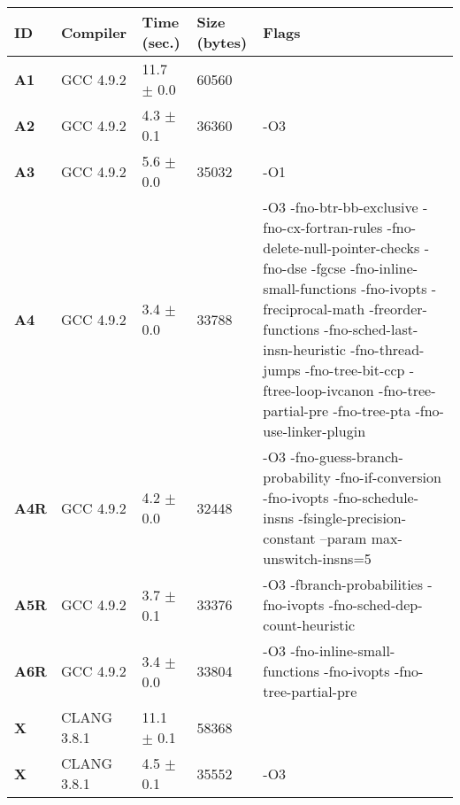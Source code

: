     \begin{tabular}{|l|l|l|l|p{3.2in}|}
     \hline
      \textbf{ID} & \textbf{Compiler} & \textbf{Time (sec.)} & \textbf{Size (bytes)} & \textbf{Flags} \\ 
     \hline
      \textbf{ A1 } &  GCC 4.9.2  &  11.7 $\pm$ 0.0  &  60560  & {\small  }\\
     \hline
      \textbf{ A2 } &  GCC 4.9.2  &  4.3 $\pm$ 0.1  &  36360  & {\small -O3 }\\
     \hline
      \textbf{ A3 } &  GCC 4.9.2  &  5.6 $\pm$ 0.0  &  35032  & {\small -O1 }\\
     \hline
      \textbf{ A4 } &  GCC 4.9.2  &  3.4 $\pm$ 0.0  &  33788  & {\small -O3 -fno-btr-bb-exclusive -fno-cx-fortran-rules -fno-delete-null-pointer-checks -fno-dse -fgcse -fno-inline-small-functions -fno-ivopts -freciprocal-math -freorder-functions -fno-sched-last-insn-heuristic -fno-thread-jumps -fno-tree-bit-ccp -ftree-loop-ivcanon -fno-tree-partial-pre -fno-tree-pta -fno-use-linker-plugin }\\
     \hline
      \textbf{ A4R } &  GCC 4.9.2  &  4.2 $\pm$ 0.0  &  32448  & {\small -O3 -fno-guess-branch-probability -fno-if-conversion -fno-ivopts -fno-schedule-insns -fsingle-precision-constant --param max-unswitch-insns=5 }\\
     \hline
      \textbf{ A5R } &  GCC 4.9.2  &  3.7 $\pm$ 0.1  &  33376  & {\small -O3 -fbranch-probabilities -fno-ivopts -fno-sched-dep-count-heuristic }\\
     \hline
      \textbf{ A6R } &  GCC 4.9.2  &  3.4 $\pm$ 0.0  &  33804  & {\small -O3 -fno-inline-small-functions -fno-ivopts -fno-tree-partial-pre }\\
     \hline
      \textbf{ X } &  CLANG 3.8.1  &  11.1 $\pm$ 0.1  &  58368  & {\small  }\\
     \hline
      \textbf{ X } &  CLANG 3.8.1  &  4.5 $\pm$ 0.1  &  35552  & {\small -O3 }\\
     \hline
    \end{tabular}    